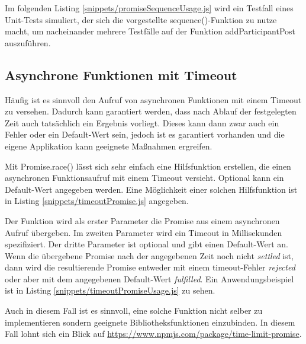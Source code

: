 \documentclass[
11pt, %
a4paper, %
oneside, %
pdfspacing, %
headinclude,
BCOR5mm, %
ngerman, %
bibtotocnumbered,
]{scrartcl}
\begin{document}
	Im folgenden Listing \ref{snippets/promiseSequenceUsage.js} wird ein Testfall eines Unit-Tests simuliert, der sich die vorgestellte \textsf{sequence()}-Funktion zu nutze macht, um nacheinander mehrere Testfälle auf der Funktion \textsf{addParticipantPost} auszuführen.
	

	\subsection{Asynchrone Funktionen mit Timeout}
	
	Häufig ist es sinnvoll den Aufruf von asynchronen Funktionen mit einem Timeout zu versehen. Dadurch kann garantiert werden, dass nach Ablauf der festgelegten Zeit auch tatsächlich ein Ergebnis vorliegt. Dieses kann dann zwar auch ein Fehler oder ein Default-Wert sein, jedoch ist es garantiert vorhanden und die eigene Applikation kann geeignete Maßnahmen ergreifen.
	
	Mit \textsf{Promise.race()} lässt sich sehr einfach eine Hilfsfunktion erstellen, die einen asynchronen Funktionsaufruf mit einem Timeout versieht. Optional kann ein Default-Wert angegeben werden. Eine Möglichkeit einer solchen Hilfsfunktion ist in Listing \ref{snippets/timeoutPromise.js} angegeben.
	
	
	Der Funktion wird als erster Parameter die Promise aus einem asynchronen Aufruf übergeben. Im zweiten Parameter wird ein Timeout in Millisekunden spezifiziert. Der dritte Parameter ist optional und gibt einen Default-Wert an. Wenn die übergebene Promise nach der angegebenen Zeit noch nicht \emph{settled} ist, dann wird die resultierende Promise entweder mit einem timeout-Fehler \emph{rejected} oder aber mit dem angegebenen Default-Wert \emph{fulfilled}.
	Ein Anwendungsbeispiel ist in Listing \ref{snippets/timeoutPromiseUsage.js} zu sehen.
	
	
	Auch in diesem Fall ist es sinnvoll, eine solche Funktion nicht selber zu implementieren sondern geeignete Bibliotheksfunktionen einzubinden. In diesem Fall lohnt sich ein Blick auf \url{https://www.npmjs.com/package/time-limit-promise}.
	
\end{document}
